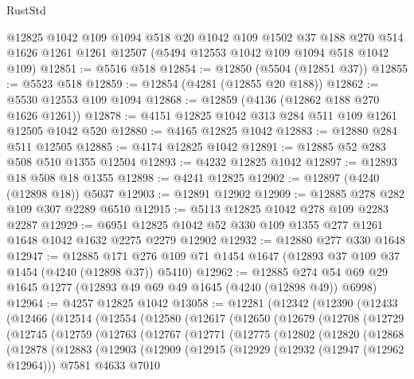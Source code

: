 \begin{lexlean}{RustStd}
\begin{coremodule}
{\begin{coremodule}
{{{{{{{{{{{{{{{{{{{{{{{{{{{{{{{{{{{    @12825
    @1042
    @109
    @1094
    @518
    @20
    @1042
    @109
    @1502
    @37
    @188
    @270
    @514
    @1626
    @1261
    @1261
    @12507
    (@5494 @12553 @1042 @109 @1094 @518 @1042 @109)
@12851 := @5516 @518
@12854 := @12850 (@5504 (@12851 @37))
@12855 := @5523 @518
@12859 := @12854 (@4281 (@12855 @20 @188))
@12862 := @5530 @12553 @109 @1094
@12868 := @12859 (@4136 (@12862 @188 @270 @1626 @1261))
@12878 := @4151 @12825 @1042 @313 @284 @511 @109 @1261 @12505 @1042 @520
@12880 := @4165 @12825 @1042
@12883 := @12880 @284 @511 @12505
@12885 := @4174 @12825 @1042
@12891 := @12885 @52 @283 @508 @510 @1355 @12504
@12893 := @4232 @12825 @1042
@12897 := @12893 @18 @508 @18 @1355
@12898 := @4241 @12825
@12902 := @12897 (@4240 (@12898 @18)) @5037
@12903 := @12891 @12902
@12909 := @12885 @278 @282 @109 @307 @2289 @6510
@12915 := @5113 @12825 @1042 @278 @109 @2283 @2287
@12929 := @6951 @12825 @1042 @52 @330 @109 @1355 @277 @1261 @1648 @1042 @1632 @2275 @2279 @12902
@12932 := @12880 @277 @330 @1648
@12947 := @12885
    @171
    @276
    @109
    @71
    @1454
    @1647
    (@12893 @37 @109 @37 @1454 (@4240 (@12898 @37)) @5410)
@12962 := @12885 @274 @54 @69 @29 @1645 @1277 (@12893 @49 @69 @49 @1645 (@4240 (@12898 @49)) @6998)
@12964 := @4257 @12825 @1042
@13058 := @12281
    (@12342
      (@12390
        (@12433
          (@12466
            (@12514
              (@12554
                (@12580
                  (@12617
                    (@12650
                      (@12679
                        (@12708
                          (@12729
                            (@12745
                              (@12759
                                (@12763
                                  (@12767
                                    (@12771
                                      (@12775
                                        (@12802
                                          (@12820
                                            (@12868
                                              (@12878
                                                (@12883
                                                  (@12903
                                                    (@12909
                                                      (@12915
                                                        (@12929
                                                          (@12932 (@12947 (@12962 @12964)))
                                                          @7581
                                                          @4633
                                                          @7010
}}}}}}}}}}}}}}}}}}}}}}}}}}}}}}}}}}}
\end{coremodule}}
\end{coremodule}
\end{lexlean}
